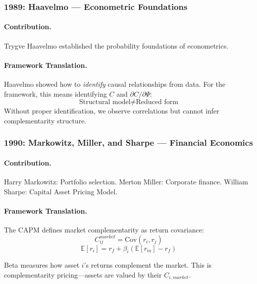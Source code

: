 \subsubsection{1989: Haavelmo --- Econometric Foundations}

\paragraph{Contribution.}
Trygve Haavelmo established the probability foundations of econometrics.

\paragraph{Framework Translation.}
Haavelmo showed how to \emph{identify} causal relationships from data.
For the framework, this means identifying $C$ and $\partial C / \partial \Psi$:
\begin{equation}
  \text{Structural model} \neq \text{Reduced form}
\end{equation}
Without proper identification, we observe correlations but cannot
infer complementarity structure.

\subsubsection{1990: Markowitz, Miller, and Sharpe --- Financial Economics}

\paragraph{Contribution.}
Harry Markowitz: Portfolio selection.
Merton Miller: Corporate finance.
William Sharpe: Capital Asset Pricing Model.

\paragraph{Framework Translation.}
The CAPM defines market complementarity as return covariance:
\begin{equation}
  C^{market}_{ij} = \text{Cov}(r_i, r_j)
\end{equation}
\begin{equation}
  \mathbb{E}[r_i] = r_f + \beta_i (\mathbb{E}[r_m] - r_f)
\end{equation}

Beta measures how asset $i$'s returns complement the market.
This is complementarity pricing---assets are valued by their $C_{i,market}$.


